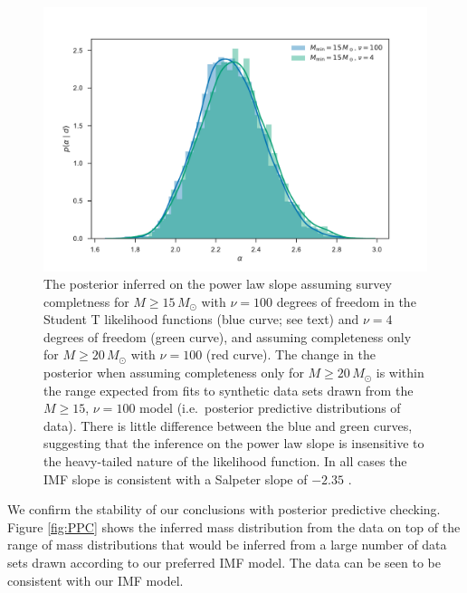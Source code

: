\documentclass[apjl]{emulateapj}
\newcommand{\MSun}{M_\odot}
\begin{document}
\begin{figure}
    		    		\includegraphics[width=\columnwidth]{alpha.pdf}
    		\caption{The posterior inferred on the power law slope assuming survey completness for $M \geq 15 \, \MSun$ with $\nu = 100$ degrees of freedom in the Student T likelihood functions (blue curve; see text) and $\nu = 4$ degrees of freedom (green curve), and assuming completeness only for $M \geq 20 \, \MSun$ with $\nu = 100$ (red curve).  The change in the posterior when assuming completeness only for $M \geq 20 \, \MSun$ is within the range expected from fits to synthetic data sets drawn from the $M \geq 15$, $\nu = 100$ model (i.e.\ posterior predictive distributions of data).  There is little difference between the blue and green curves, suggesting that the inference on the power law slope is insensitive to the heavy-tailed nature of the likelihood function.  In all cases the IMF slope is consistent with a Salpeter slope of $-2.35$ \citep{Salpeter:1955}. }\label{fig:IMF}
\end{figure}

We confirm the stability of our conclusions with posterior predictive checking.  Figure \ref{fig:PPC} shows the inferred mass distribution from the data on top of the range of mass distributions that would be inferred from a large number of data sets drawn according to our preferred IMF model.  The data can be seen to be consistent with our IMF model.
\end{document}
